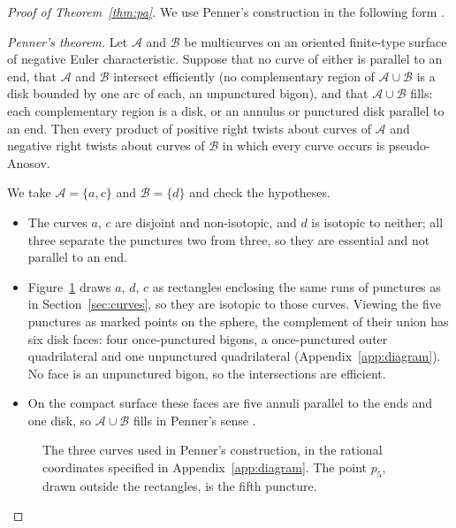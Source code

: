 \documentclass[11pt]{article}
\theoremstyle{remark}
\begin{document}
\begin{proof}[Proof of Theorem~\ref{thm:pa}]
We use Penner's construction in the following form
\cite[Theorem~3.1, p.~187, and definitions on pp.~180--181]{Penner}.

\smallskip\noindent\emph{Penner's theorem.} Let $\mathcal A$ and $\mathcal B$
be multicurves on an oriented finite-type surface of negative Euler
characteristic. Suppose that no curve of either is parallel to an end,
that $\mathcal A$ and $\mathcal B$ intersect
efficiently (no complementary region of $\mathcal A\cup\mathcal B$ is a disk bounded by one
arc of each, an unpunctured bigon), and that $\mathcal A\cup\mathcal B$ fills: each
complementary region is a disk, or an annulus or punctured disk parallel
to an end. Then every product of positive right twists about curves of
$\mathcal A$ and negative right twists about curves of $\mathcal B$ in which
every curve occurs
is pseudo-Anosov.

\smallskip
We take $\mathcal A=\{a,c\}$ and $\mathcal B=\{d\}$ and check the hypotheses.
\begin{itemize}
\item[(i)] The curves $a$, $c$ are disjoint and non-isotopic, and $d$ is
  isotopic to neither; all three separate the punctures two from three, so
  they are essential and not parallel to an end.
\item[(ii)] Figure~\ref{fig:penner} draws $a$, $d$, $c$ as rectangles
  enclosing the same runs of punctures as in Section~\ref{sec:curves}, so
  they are isotopic to those curves. Viewing the five punctures as marked points on the sphere, the
  complement of their union has six disk faces: four once-punctured
  bigons, a once-punctured outer quadrilateral and one unpunctured
  quadrilateral (Appendix~\ref{app:diagram}). No face is an unpunctured
  bigon, so the intersections are efficient.
\item[(iii)] On the compact surface these faces are five annuli parallel
  to the ends and one disk, so $\mathcal A\cup\mathcal B$ fills in Penner's sense
  \cite[p.~181]{Penner}.
\end{itemize}

\begin{figure}[ht]
\centering
{}
\caption{The three curves used in Penner's construction, in the rational
coordinates specified in Appendix~\ref{app:diagram}. The point $p_5$, drawn outside the
rectangles, is the fifth puncture.}
\label{fig:penner}
\end{figure}


\end{proof}
\end{document}
